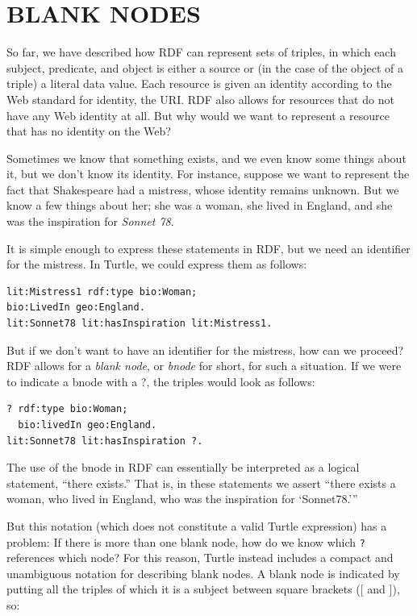 \section{BLANK NODES}

So far, we have described how RDF can represent sets of triples, in
which each subject, predicate, and object is either a source or (in the
case of the object of a triple) a literal data value. Each resource is
given an identity according to the Web standard for identity, the URI.
RDF also allows for resources that do not have any Web identity at all.
But why would we want to represent a resource that has no identity on
the Web?

Sometimes we know that something exists, and we even know some things
about it, but we don't know its identity. For instance, suppose we want
to represent the fact that Shakespeare had a mistress, whose identity
remains unknown. But we know a few things about her; she was a woman,
she lived in England, and she was the inspiration for \emph{Sonnet 78}.

It is simple enough to express these statements in RDF, but we need an
identifier for the mistress. In
Turtle, we could express them as follows:

\begin{lstlisting}
lit:Mistress1 rdf:type bio:Woman;
bio:LivedIn geo:England.
lit:Sonnet78 lit:hasInspiration lit:Mistress1.
\end{lstlisting}

But if we don't want to have an identifier for the mistress, how can we
proceed? RDF allows for a \emph{blank node}, or \emph{bnode} for short, for such a
situation. If we were to indicate a bnode with a ?, the triples would
look as follows:

\begin{lstlisting}
? rdf:type bio:Woman;
  bio:livedIn geo:England. 
lit:Sonnet78 lit:hasInspiration ?.
\end{lstlisting}

The use of the bnode in RDF can essentially be interpreted as a logical
statement, ``there exists.'' That is, in these statements we assert
``there exists a woman, who lived in England, who was the inspiration
for `Sonnet78.'''

But this notation (which does not constitute a valid Turtle expression)
has a problem: If there is
more than one blank node, how do we know which \texttt{?} references which
node? For this reason, Turtle instead includes a compact and unambiguous
notation for describing blank nodes. A blank node is indicated by
putting all the triples of which it is a subject between square brackets
({[} and {]}), so:

